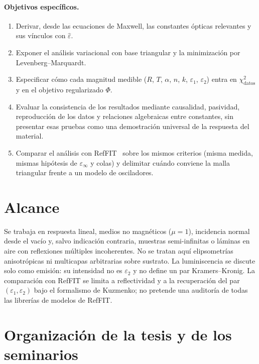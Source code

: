\paragraph{Objetivos espec\'ificos.}
\begin{enumerate}[leftmargin=*]
\item Derivar, desde las ecuaciones de Maxwell, las constantes \'opticas relevantes y sus v\'inculos con $\hat\varepsilon$.
\item Exponer el an\'alisis variacional con base triangular y la minimizaci\'on por Levenberg--Marquardt.
\item Especificar c\'omo cada magnitud medible ($R$, $T$, $\alpha$, $n$, $k$, $\varepsilon_1$, $\varepsilon_2$) entra en $\chi^{2}_{\mathrm{datos}}$ y en el objetivo regularizado $\Phi$.
\item Evaluar la consistencia de los resultados mediante causalidad, pasividad, reproducci\'on de los datos y relaciones algebraicas entre constantes, sin presentar esas pruebas como una demostraci\'on universal de la respuesta del material.
\item Comparar el an\'alisis con RefFIT~\cite{guide,constrained} sobre los mismos criterios (misma medida, mismas hip\'otesis de $\varepsilon_\infty$ y colas) y delimitar cu\'ando conviene la malla triangular frente a un modelo de osciladores.
\end{enumerate}

\section{Alcance}

Se trabaja en respuesta lineal, medios no magn\'eticos ($\mu=1$), incidencia normal desde el vac\'io y, salvo indicaci\'on contraria, muestras semi-infinitas o l\'aminas en aire con reflexiones m\'ultiples incoherentes.
No se tratan aqu\'i elipsometr\'ias anisotr\'opicas ni multicapas arbitrarias sobre sustrato.
La luminiscencia se discute solo como emisi\'on: su intensidad no es $\varepsilon_2$ y no define un par Kramers--Kronig.
La comparaci\'on con RefFIT se limita a reflectividad y a la recuperaci\'on del par $(\varepsilon_1,\varepsilon_2)$ bajo el formalismo de Kuzmenko; no pretende una auditor\'ia de todas las librer\'ias de modelos de RefFIT.

\section{Organizaci\'on de la tesis y de los seminarios}


